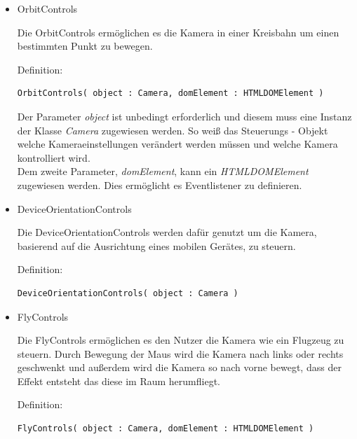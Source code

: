 \begin{itemize}
    \item OrbitControls 
  
Die OrbitControls ermöglichen es die Kamera in einer Kreisbahn um einen bestimmten Punkt zu bewegen. 

Definition:
\begin{lstlisting}
OrbitControls( object : Camera, domElement : HTMLDOMElement )
\end{lstlisting}
Der Parameter \textit{object} ist unbedingt erforderlich und diesem muss eine Instanz der Klasse \textit{Camera} zugewiesen werden. So weiß das Steuerungs - Objekt welche Kameraeinstellungen verändert werden müssen und welche Kamera kontrolliert wird. \\
Dem zweite Parameter, \textit{domElement}, kann ein \textit{HTMLDOMElement} zugewiesen werden. Dies ermöglicht es Eventlistener zu definieren. 
\item DeviceOrientationControls

Die DeviceOrientationControls werden dafür genutzt um die Kamera, basierend auf die Ausrichtung eines mobilen Gerätes, zu steuern.

Definition:
\begin{lstlisting}
DeviceOrientationControls( object : Camera )
\end{lstlisting}
\item FlyControls

Die FlyControls ermöglichen es den Nutzer die Kamera wie ein Flugzeug zu steuern. Durch Bewegung der Maus wird die Kamera nach links oder rechts geschwenkt und außerdem wird die Kamera so nach vorne bewegt, dass der Effekt entsteht das diese im Raum herumfliegt.

Definition:
\begin{lstlisting}
FlyControls( object : Camera, domElement : HTMLDOMElement )
\end{lstlisting}
\end{itemize}
\newpage
